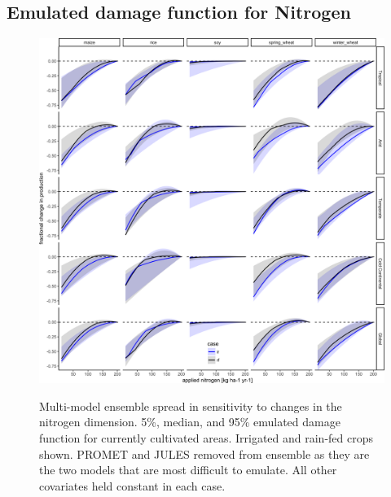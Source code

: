 \documentclass[10pt]{article}
\begin{document}
\subsection{Emulated damage function for Nitrogen}
\begin{figure}[h!]
\includegraphics[width=\textwidth]{s_nitrogen.png}\\
\caption{Multi-model ensemble spread in sensitivity to changes in the nitrogen dimension. 5\%, median, and 95\% emulated damage function for currently cultivated areas. Irrigated and rain-fed crops shown. PROMET and JULES removed from ensemble as they are the two models that are most difficult to emulate. All other covariates held constant in each case.}
\label{fig:nitrogen}
\end{figure}
\clearpage
\end{document}
